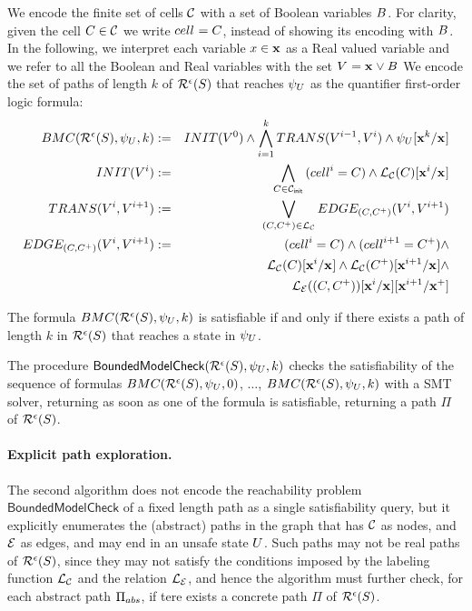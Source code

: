 We encode the finite set of cells $\mathcal{C}$ with a set of Boolean
variables ${B}^{}$. For clarity, given the cell $C \in \mathcal{C}$ we
write ${cell}^{} = C$, instead of showing its encoding with ${B}^{}$.
%
In the following, we interpret each variable $x \in \mathbf{x}$ as a Real
valued variable and we refer to all the Boolean and Real variables
with the set ${V}^{} = {\mathbf{x}}^{} \vee {B}^{}$
%
We encode the set of paths of length $k$ of
$\mathcal{R}^{\epsilon}(S)$ that reaches ${\psi}_{U}$
as the quantifier first-order logic formula:
\begin{eqnarray*}
BMC(\mathcal{R}^{\epsilon}(S), {\psi}_{U}, k) & := &
INIT({V}^{0}) \wedge
\bigwedge_{i=1}^{k}{TRANS({V}^{i-1}, {V}^{i})} \wedge
{\ensuremath{{\psi}_{U}}}[{{\mathbf{x}}^{k}}/{{\mathbf{x}}^{}}]\\
INIT({V}^{i}) & := &
\bigwedge_{C \in \mathcal{C}_{\mathsf{init}}}{({cell}^{i} = C) \wedge
{\ensuremath \mathcal{L}_\ensuremath \mathcal{C}(C)}[{{\mathbf{x}}^{i}}/{{\mathbf{x}}^{}}]
}
\\
TRANS({V}^{i}, {V}^{i+1}) & := &
  \bigvee_{(C,C^+) \in \mathcal{L}_\mathcal{C}}{
    EDGE_{(C,C^+)}({V}^{i}, {V}^{i+1})
  } \\
EDGE_{(C,C^+)}({V}^{i}, {V}^{i+1}) & := &
({cell}^{i} = C) \wedge ({cell}^{i+1} = C^+) \wedge  \\
&& {\mathcal{L}_\mathcal{C}(C)}[{{\mathbf{x}}^{i}}/{{\mathbf{x}}^{}}] \wedge
   {\ensuremath \mathcal{L}_\ensuremath \mathcal{C}(C^+)}[{{\mathbf{x}}^{i+1}}/{{\mathbf{x}}^{}}] \wedge \\
&& {{\mathcal{L}_\mathcal{E}((C,C^+))}[{{\mathbf{x}}^{i}}/{{\mathbf{x}}^{}}]}[{{\mathbf{x}}^{i+1}}/{{{\mathbf{x}}^{+}}}]
\end{eqnarray*}

The formula
$BMC(\mathcal{R}^{\epsilon}(S), {\psi}_{U}, k)$ is satisfiable
if and only if there exists a path of length $k$ in 
$\mathcal{R}^{\epsilon}(S)$ that reaches a state in ${\psi}_{U}$.

The procedure
$\mathsf{BoundedModelCheck}(\mathcal{R}^{\epsilon}(S), {\psi}_{U}, k)$
checks the satisfiability of the sequence of formulas 
$BMC(\mathcal{R}^{\epsilon}(S), {\psi}_{U}, 0)$, 
$\ldots$,
$BMC(\mathcal{R}^{\epsilon}(S), {\psi}_{U}, k)$
with a SMT solver, returning as soon as one of the formula is
satisfiable, returning a path $\Pi$ of
$\mathcal{R}^{\epsilon}(S)$.

\paragraph{Explicit path exploration.}
The second algorithm does not encode the reachability problem
$\mathsf{BoundedModelCheck}$ of a fixed length path as a single
satisfiability query, but it explicitly enumerates
the (abstract) paths in the graph that has $\mathcal{C}$
as nodes, and $\mathcal{E}$ as edges, and may end in an unsafe state
$U$.
%
Such paths may not be real paths of
$\mathcal{R}^{\epsilon}(S)$, since they may not satisfy the
conditions imposed by the labeling function $\mathcal{L}_\mathcal{C}$
and the relation $\mathcal{L}_\mathcal{E}$, and hence the algorithm must
further check, for each abstract path $\Pi_{abs}$, if tere exists a 
concrete path $\Pi$ of
$\mathcal{R}^{\epsilon}(S)$.

